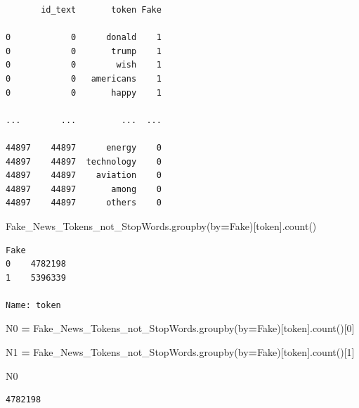 \documentclass[
  11pt,
  a4paper,
]{article}
\newenvironment{Shaded}{\begin{snugshade}}{\end{snugshade}}
\newcommand{\DecValTok}[1]{\textcolor[rgb]{0.00,0.00,0.81}{#1}}
\newcommand{\NormalTok}[1]{#1}
\newcommand{\OperatorTok}[1]{\textcolor[rgb]{0.81,0.36,0.00}{\textbf{#1}}}
\newcommand{\StringTok}[1]{\textcolor[rgb]{0.31,0.60,0.02}{#1}}
\begin{document}
\begin{verbatim}
       id_text       token Fake
       
0            0      donald    1
0            0       trump    1
0            0        wish    1
0            0   americans    1
0            0       happy    1

...        ...         ...  ...

44897    44897      energy    0
44897    44897  technology    0
44897    44897    aviation    0
44897    44897       among    0
44897    44897      others    0
\end{verbatim}

\begin{Shaded}
\begin{Highlighting}[]
\NormalTok{Fake\_News\_Tokens\_not\_StopWords.groupby(by}\OperatorTok{=}\StringTok{\textquotesingle{}Fake\textquotesingle{}}\NormalTok{)[}\StringTok{\textquotesingle{}token\textquotesingle{}}\NormalTok{].count()}
\end{Highlighting}
\end{Shaded}

\begin{verbatim}
Fake
0    4782198
1    5396339

Name: token
\end{verbatim}

\begin{Shaded}
\begin{Highlighting}[]
\NormalTok{N0 }\OperatorTok{=}\NormalTok{ Fake\_News\_Tokens\_not\_StopWords.groupby(by}\OperatorTok{=}\StringTok{\textquotesingle{}Fake\textquotesingle{}}\NormalTok{)[}\StringTok{\textquotesingle{}token\textquotesingle{}}\NormalTok{].count()[}\DecValTok{0}\NormalTok{]}

\NormalTok{N1 }\OperatorTok{=}\NormalTok{ Fake\_News\_Tokens\_not\_StopWords.groupby(by}\OperatorTok{=}\StringTok{\textquotesingle{}Fake\textquotesingle{}}\NormalTok{)[}\StringTok{\textquotesingle{}token\textquotesingle{}}\NormalTok{].count()[}\DecValTok{1}\NormalTok{]}
\end{Highlighting}
\end{Shaded}

\begin{Shaded}
\begin{Highlighting}[]
\NormalTok{N0}
\end{Highlighting}
\end{Shaded}

\begin{verbatim}
4782198
\end{verbatim}
\end{document}
